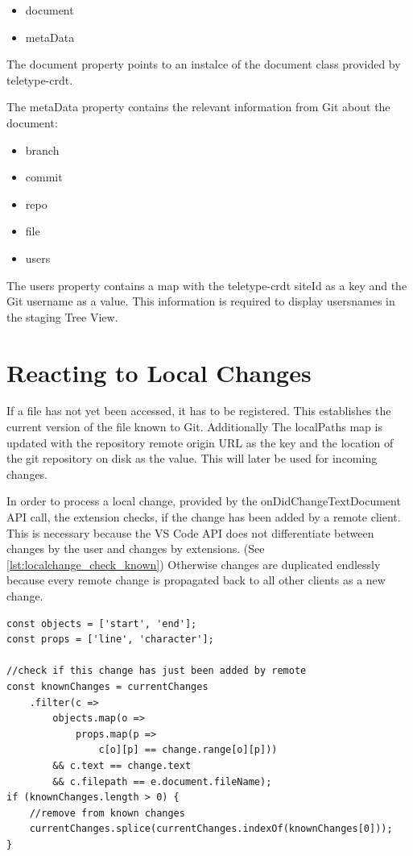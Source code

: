 \begin{itemize}
    \item document
    \item metaData
\end{itemize}

The document property points to an instalce of the document class provided by teletype-crdt.

The metaData property contains the relevant information from Git about the document:
\begin{itemize}
    \item branch
    \item commit
    \item repo
    \item file
    \item users
\end{itemize}

The users property contains a map with the teletype-crdt siteId as a key and the Git username as a value.
This information is required to display usersnames in the staging Tree View.

\section{Reacting to Local Changes}
If a file has not yet been accessed, it has to be registered. This establishes the current version of the file known to Git. Additionally The localPaths map is updated with the repository remote origin URL as the key and the location of the git repository on disk as the value. This will later be used for incoming changes.

In order to process a local change, provided by the onDidChangeTextDocument API call, the extension checks, if the change has been added by a remote client. This is necessary because the VS Code API does not differentiate between changes by the user and changes by extensions. (See \ref{lst:localchange_check_known}) Otherwise changes are duplicated endlessly because every remote change is propagated back to all other clients as a new change.

\begin{lstlisting}[label={lst:localchange_check_known}, caption=Is This Change Already Known to The Data Model? ]
const objects = ['start', 'end'];
const props = ['line', 'character'];

//check if this change has just been added by remote
const knownChanges = currentChanges
    .filter(c => 
        objects.map(o => 
            props.map(p => 
                c[o][p] == change.range[o][p])) 
        && c.text == change.text 
        && c.filepath == e.document.fileName);
if (knownChanges.length > 0) {
    //remove from known changes
    currentChanges.splice(currentChanges.indexOf(knownChanges[0]));
}
\end{lstlisting}

